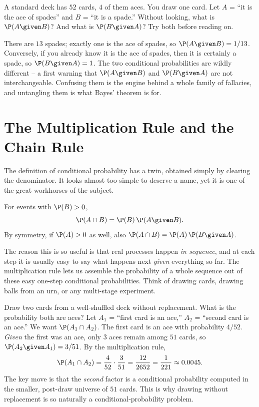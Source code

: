 \begin{walkbox}
A standard deck has $52$ cards, $4$ of them aces. You draw one card. Let $A$ = ``it is the ace of spades'' and $B$ = ``it is a spade.'' Without looking, what is $\P(A \given B)$? And what is $\P(B \given A)$? Try both before reading on.

There are $13$ spades; exactly one is the ace of spades, so $\P(A\given B) = 1/13$. Conversely, if you already know it is the ace of spades, then it is certainly a spade, so $\P(B\given A) = 1$. The two conditional probabilities are wildly different -- a first warning that $\P(A\given B)$ and $\P(B\given A)$ are not interchangeable. Confusing them is the engine behind a whole family of fallacies, and untangling them is what Bayes' theorem is for.
\end{walkbox}

\section{The Multiplication Rule and the Chain Rule}
\label{ch04:multiplication}

The definition of conditional probability has a twin, obtained simply by clearing the denominator. It looks almost too simple to deserve a name, yet it is one of the great workhorses of the subject.

\begin{proposition}
\label{ch04:mult-rule}
For events with $\P(B) > 0$,
\[
\P(A \cap B) = \P(B)\,\P(A \given B).
\]
By symmetry, if $\P(A) > 0$ as well, also $\P(A\cap B) = \P(A)\,\P(B \given A)$.
\end{proposition}

The reason this is so useful is that real processes happen \emph{in sequence}, and at each step it is usually easy to say what happens next \emph{given} everything so far. The multiplication rule lets us assemble the probability of a whole sequence out of these easy one-step conditional probabilities. Think of drawing cards, drawing balls from an urn, or any multi-stage experiment.

\begin{example}
\label{ch04:ex-two-aces}
Draw two cards from a well-shuffled deck without replacement. What is the probability both are aces? Let $A_1$ = ``first card is an ace,'' $A_2$ = ``second card is an ace.'' We want $\P(A_1 \cap A_2)$. The first card is an ace with probability $4/52$. \emph{Given} the first was an ace, only $3$ aces remain among $51$ cards, so $\P(A_2 \given A_1) = 3/51$. By the multiplication rule,
\[
\P(A_1 \cap A_2) = \frac{4}{52}\cdot\frac{3}{51} = \frac{12}{2652} = \frac{1}{221} \approx 0.0045.
\]
The key move is that the \emph{second} factor is a conditional probability computed in the smaller, post-draw universe of $51$ cards. This is why drawing without replacement is so naturally a conditional-probability problem.
\end{example}

